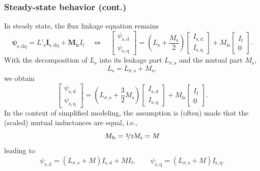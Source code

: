 \begin{frame}
	\frametitle{Steady-state behavior (cont.)}
	In steady state, the flux linkage equation remains
	$$\bm{\psi}_\mathrm{s,dq} =  L'_\mathrm{s} \bm{I}_\mathrm{s,dq} + \bm{M}_\mathrm{fs} I_{\mathrm{f}} \quad \Leftrightarrow \quad \begin{bmatrix}
			\psi_\mathrm{s,d} \\ \psi_\mathrm{s,q}
		\end{bmatrix} = \left(L_\mathrm{s} +\frac{M_\mathrm{s}}{2}\right)\begin{bmatrix}
			I_\mathrm{s,d} \\ I_\mathrm{s,q}
		\end{bmatrix} + M_\mathrm{fs} \begin{bmatrix}
			I_\mathrm{f} \\ 0
		\end{bmatrix}.$$
	\pause
	With the decomposition of $L_\mathrm{s}$ into its leakage part $L_{\sigma,\mathrm{s}}$ and the mutual part $M_\mathrm{s}$,
	\begin{equation}
		L_\mathrm{s} = L_{\sigma,\mathrm{s}} + M_{\mathrm{s}},
	\end{equation}
	\pause
	we obtain
	\begin{equation}
		\begin{bmatrix}
			\psi_\mathrm{s,d} \\ \psi_\mathrm{s,q}
		\end{bmatrix} = \left(L_{\sigma,\mathrm{s}} + \frac{3}{2}M_\mathrm{s}\right)\begin{bmatrix}
			I_\mathrm{s,d} \\ I_\mathrm{s,q}
		\end{bmatrix} + M_\mathrm{fs} \begin{bmatrix}
			I_\mathrm{f} \\ 0
		\end{bmatrix}.
	\end{equation}
	\pause
	In the context of simplified modeling, the assumption is (often) made that the (scaled) mutual inductances are equal, i.e.,
	$$M_\mathrm{fs} = \nicefrac{3}{2} M_\mathrm{s} = M$$
	\pause
	leading to
	\begin{equation}
		\psi_\mathrm{s,d} = \left(L_{\sigma,\mathrm{s}} + M\right)I_\mathrm{s,d} + M I_\mathrm{f}, \qquad \psi_\mathrm{s,q} = \left(L_{\sigma,\mathrm{s}} + M\right)I_\mathrm{s,q}.
		\label{eq:SM_stator_flux_linkage_steady_state}
	\end{equation}
\end{frame}

